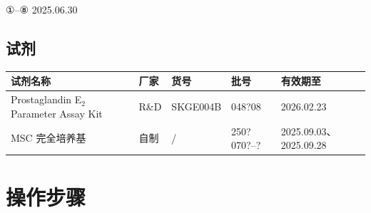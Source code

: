 \documentclass[UTF8,10pt,a4paper,fontset=fandol]{ctexart}
\newcommand{\fieldvalue}[1]{#1}
\newcommand{\handwritten}[1]{#1}
\begin{document}
\handwritten{①--⑧}
\handwritten{2025.06.30}

\subsection{试剂}

\begin{tabularx}{\textwidth}{|X|l|l|l|l|}
\hline
试剂名称 & 厂家 & 货号 & 批号 & 有效期至 \\
\hline
Prostaglandin E$_2$ Parameter Assay Kit & R\&D & SKGE004B &
\fieldvalue{\handwritten{048?08}} &
\fieldvalue{\handwritten{2026.02.23}}
\\ \hline
MSC 完全培养基 & 自制 & / &
\fieldvalue{\handwritten{250?070?--?}} &
\fieldvalue{\handwritten{2025.09.03、2025.09.28}}
\\ \hline
\end{tabularx}

\section{操作步骤}
\end{document}

